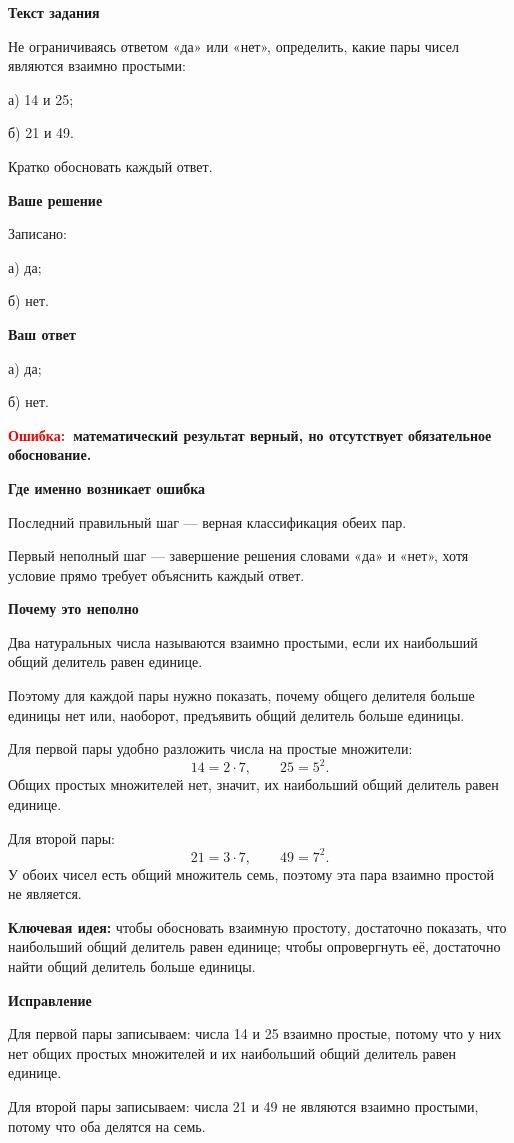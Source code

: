 \documentclass[12pt,a4paper]{article}
\newcommand{\err}{\textcolor{red}{Ошибка:}}
\newcommand{\idea}{\textcolor{blue!60!black}{Ключевая идея:}}
\begin{document}
\textbf{Текст задания}

Не ограничиваясь ответом «да» или «нет», определить, какие пары чисел являются взаимно простыми:

а) 14 и 25;

б) 21 и 49.

Кратко обосновать каждый ответ.

\textbf{Ваше решение}

Записано:

а) да;

б) нет.

\textbf{Ваш ответ}

а) да;

б) нет.

\textbf{\err\ математический результат верный, но отсутствует обязательное обоснование.}

\textbf{Где именно возникает ошибка}

Последний правильный шаг --- верная классификация обеих пар.

Первый неполный шаг --- завершение решения словами «да» и «нет», хотя условие прямо требует объяснить каждый ответ.

\textbf{Почему это неполно}

Два натуральных числа называются взаимно простыми, если их наибольший общий делитель равен единице.

Поэтому для каждой пары нужно показать, почему общего делителя больше единицы нет или, наоборот, предъявить общий делитель больше единицы.

Для первой пары удобно разложить числа на простые множители:
\[
14=2\cdot7,
\qquad
25=5^2.
\]
Общих простых множителей нет, значит, их наибольший общий делитель равен единице.

Для второй пары:
\[
21=3\cdot7,
\qquad
49=7^2.
\]
У обоих чисел есть общий множитель семь, поэтому эта пара взаимно простой не является.

\textbf{\idea} чтобы обосновать взаимную простоту, достаточно показать, что наибольший общий делитель равен единице; чтобы опровергнуть её, достаточно найти общий делитель больше единицы.

\textbf{Исправление}

Для первой пары записываем: числа 14 и 25 взаимно простые, потому что у них нет общих простых множителей и их наибольший общий делитель равен единице.

Для второй пары записываем: числа 21 и 49 не являются взаимно простыми, потому что оба делятся на семь.
\end{document}
